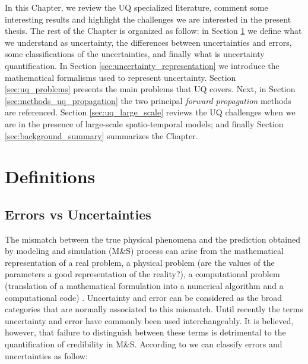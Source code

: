 In this Chapter, we review the UQ specialized literature, comment some interesting results and highlight the challenges we are interested in the present thesis. The rest of the Chapter is organized as follow: in Section \ref{sec:definitions} we define what we understand as uncertainty, the differences between uncertainties and errors, some classifications of the uncertainties, and finally what is uncertainty quantification. In Section \ref{sec:uncertainty_representation} we introduce the mathematical formalisms used to represent uncertainty. Section \ref{sec:uq_problems} presents the main problems that UQ covers. Next, in Section \ref{sec:methods_uq_propagation} the two principal \textit{forward propagation} methods are referenced. Section \ref{sec:uq_large_scale} reviews the UQ challenges when we are in the presence of large-scale spatio-temporal models; and finally Section \ref{sec:background_summary} summarizes the Chapter.

\section{Definitions}\label{sec:definitions}
\subsection{Errors vs Uncertainties}

The mismatch between the true physical phenomena and the prediction obtained by modeling and simulation (M\&S) process can arise from the mathematical representation of a real problem, a physical problem (are the values of the parameters a good representation of the reality?), a computational problem (translation of a mathematical formulation into a numerical algorithm and a computational code) \cite{Lavril2015}. Uncertainty and error can be considered as the broad categories  that  are  normally  associated to this mismatch. Until recently the terms uncertainty  and error  have  commonly  been  used  interchangeably.  It is believed, however, that failure to distinguish between these terms is detrimental to the quantification of credibility in M\&S. According to \cite{Alvin1998} we can classify errors and uncertainties as follow: 

